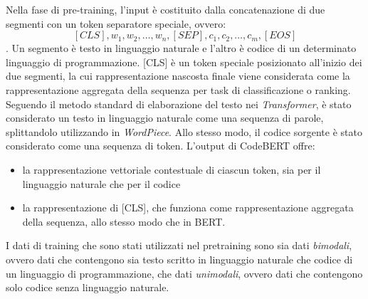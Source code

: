 \documentclass[../../Thesis.tex]{subfiles}
\begin{document}
Nella fase di pre-training, l'input è costituito dalla concatenazione di due segmenti con un token separatore speciale, ovvero: $$[CLS], w_1, w_2, \ldots, w_n, [SEP], c_1, c_2, \ldots, c_m, [EOS]$$. Un segmento è testo in linguaggio naturale e l'altro è codice di un determinato linguaggio di programmazione. [CLS] è un token speciale posizionato all'inizio dei due segmenti, la cui rappresentazione nascosta finale viene considerata come la rappresentazione aggregata della sequenza per task di classificazione o ranking. Seguendo il metodo standard di elaborazione del testo nei \textit{Transformer}, è stato considerato un testo in linguaggio naturale come una sequenza di parole, splittandolo utilizzando in \textit{WordPiece}. Allo stesso modo, il codice sorgente è stato considerato come una sequenza di token.
L'output di CodeBERT offre: 
\begin{itemize}
    \item la rappresentazione vettoriale contestuale di ciascun token, sia per il linguaggio naturale che per il codice
    \item la rappresentazione di [CLS], che funziona come rappresentazione aggregata della sequenza, allo stesso modo che in BERT.
\end{itemize}
I dati di training che sono stati utilizzati nel pretraining sono sia dati \emph{bimodali}, ovvero dati che contengono sia testo scritto in linguaggio naturale che codice di un linguaggio di programmazione, che dati \emph{unimodali}, ovvero dati che contengono solo codice senza linguaggio naturale. 
\end{document}
